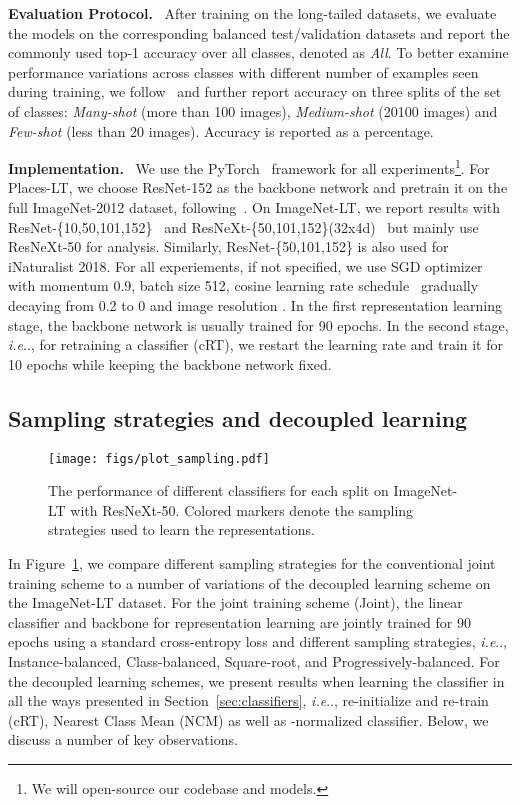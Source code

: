 \documentclass[dvipsnames]{article} \usepackage{iclr2020_conference, times}
\makeatletter
\DeclareRobustCommand\onedot{\futurelet\@let@token\@onedot}
\def\@onedot{\ifx\@let@token.\else.\null\fi\xspace}
\def\ie{\emph{i.e}\onedot} \def\Ie{\emph{I.e}\onedot}
\newcommand{\header}[1]{\noindent\textbf{#1.}~}
\newcommand{\Uniform}{Instance-balanced\xspace}
\newcommand{\Balanced}{Class-balanced\xspace}
\newcommand{\Squareroot}{Square-root\xspace}
\newcommand{\Shift}{Progressively-balanced\xspace}
\newcommand{\retrain}{cRT\xspace}
\makeatother
\begin{document}
\header{Evaluation Protocol} After training on the long-tailed datasets, we evaluate the models on the corresponding balanced test/validation datasets and report the commonly used top-1 accuracy over all classes, denoted  as \emph{All}. 
To better examine performance variations across classes with different number of examples seen during training, we follow~\citet{liu2019large} and further report accuracy on three splits of the set of classes: \emph{Many-shot} (more than 100 images), \emph{Medium-shot} (20100 images) and \emph{Few-shot} (less than 20 images). Accuracy is reported as a percentage.


\header{Implementation} We use the PyTorch~\citep{paszke2017automatic} framework for all experiments\footnote{We will open-source our codebase and models.}. For Places-LT, we choose ResNet-152 as the backbone network and pretrain it on the full ImageNet-2012 dataset, following~\citet{liu2019large}. On ImageNet-LT, we report results with ResNet-\{10,50,101,152\}~\citep{he2016deep} and ResNeXt-\{50,101,152\}(32x4d)~\citep{xie2017aggregated} but mainly use ResNeXt-50 for analysis. Similarly, ResNet-\{50,101,152\} is also used for iNaturalist 2018. For all experiements, if not specified, we use SGD optimizer with momentum 0.9, batch size 512, cosine learning rate schedule~\citep{loshchilov2016sgdr} gradually decaying from 0.2 to 0 
and image resolution . 
In the first representation learning stage, the backbone network is usually trained for 90 epochs. In the second stage, \ie, for retraining a classifier (\retrain), we restart the learning rate and train it for 10 epochs while keeping the backbone network fixed.  

\subsection{Sampling strategies and decoupled learning}



\begin{figure}[t]
    \centering
    \texttt{[image: figs/plot\_sampling.pdf]}
    \caption{The performance of different classifiers for each split on ImageNet-LT with ResNeXt-50. Colored markers denote the sampling strategies used to learn the representations.}
    \label{fig:classifiers_vs_samplings}
\end{figure}



In Figure~\ref{fig:classifiers_vs_samplings}, we compare different sampling strategies for the conventional joint training scheme to a number of variations of the decoupled learning scheme on the ImageNet-LT dataset. For the joint training scheme (Joint), the linear classifier and backbone for representation learning are jointly trained for 90 epochs using a standard cross-entropy loss and different sampling strategies, \ie, \Uniform, \Balanced, \Squareroot, and \Shift. For the decoupled learning schemes, we present results when learning the classifier in all the ways presented in Section~\ref{sec:classifiers}, \ie, re-initialize and re-train (cRT), Nearest Class Mean (NCM) as well as -normalized classifier. 
Below, we discuss a number of key observations.
\end{document}
